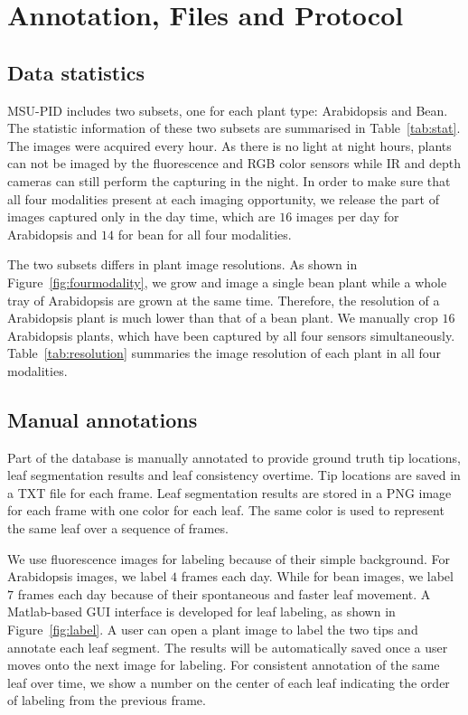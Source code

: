 \section{Annotation, Files and Protocol}
\subsection{Data statistics}
MSU-PID includes two subsets, one for each plant type: Arabidopsis and Bean.
The statistic information of these two subsets are summarised in Table~\ref{tab:stat}.
The images were acquired every hour.
As there is no light at night hours, plants can not be imaged by the fluorescence and RGB color sensors while IR and depth cameras can still perform the capturing in the night.
In order to make sure that all four modalities present at each imaging opportunity, we release the part of images captured only in the day time, which are $16$ images per day for Arabidopsis and $14$ for bean for all four modalities.



The two subsets differs in plant image resolutions.
As shown in Figure~\ref{fig:fourmodality},  we grow and image a single bean plant while a whole tray of Arabidopsis are grown at the same time.
Therefore, the resolution of a Arabidopsis plant is much lower than that of a bean plant.
We manually crop $16$ Arabidopsis plants, which have been captured by all four sensors simultaneously.
Table~\ref{tab:resolution} summaries the image resolution of each plant in all four modalities.



\subsection{Manual annotations}
Part of the database is manually annotated to provide ground truth tip locations, leaf segmentation results and leaf consistency overtime.
Tip locations are saved in a TXT file for each frame.
Leaf segmentation results are stored in a PNG image for each frame with one color for each leaf.
The same color is used to represent the same leaf over a sequence of frames.

We use fluorescence images for labeling because of their simple background.
For Arabidopsis images, we label $4$ frames each day.
While for bean images, we label $7$ frames each day because of their spontaneous and faster leaf movement.
A Matlab-based GUI interface is developed for leaf labeling, as shown in Figure~\ref{fig:label}.
A user can open a plant image to label the two tips and annotate each leaf segment.
The results will be automatically saved once a user moves onto the next image for labeling.
For consistent annotation of the same leaf over time, we show a number on the center of each leaf indicating the order of labeling from the previous frame.


